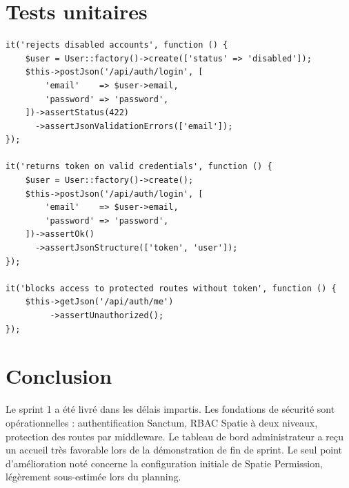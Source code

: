 \section{Tests unitaires}

\begin{lstlisting}[style=phpstyle,caption={Tests unitaires — Authentification (PestPHP)},label={lst:tests_s1}]
it('rejects disabled accounts', function () {
    $user = User::factory()->create(['status' => 'disabled']);
    $this->postJson('/api/auth/login', [
        'email'    => $user->email,
        'password' => 'password',
    ])->assertStatus(422)
      ->assertJsonValidationErrors(['email']);
});

it('returns token on valid credentials', function () {
    $user = User::factory()->create();
    $this->postJson('/api/auth/login', [
        'email'    => $user->email,
        'password' => 'password',
    ])->assertOk()
      ->assertJsonStructure(['token', 'user']);
});

it('blocks access to protected routes without token', function () {
    $this->getJson('/api/auth/me')
         ->assertUnauthorized();
});
\end{lstlisting}

\section*{Conclusion}
Le sprint 1 a été livré dans les délais impartis. Les fondations de sécurité
sont opérationnelles : authentification Sanctum, RBAC Spatie à deux niveaux,
protection des routes par middleware. Le tableau de bord administrateur a reçu
un accueil très favorable lors de la démonstration de fin de sprint. Le seul
point d'amélioration noté concerne la configuration initiale de Spatie Permission,
légèrement sous-estimée lors du planning.
